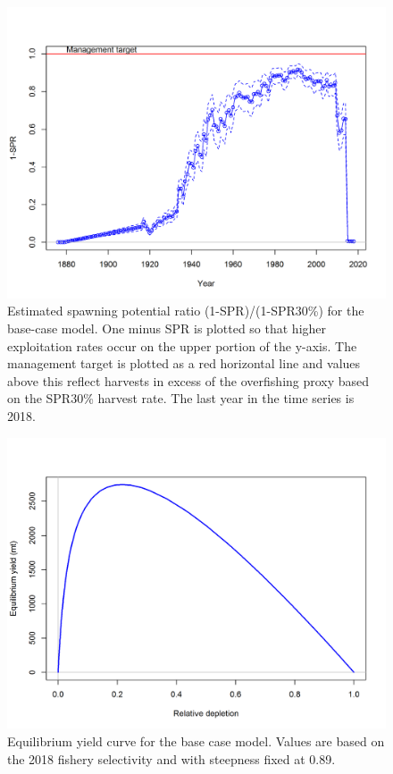 \documentclass[12pt,]{article}
\begin{document}
\begin{figure}[htbp]
\centering
\includegraphics{r4ss/plots_mod1/SPR3_ratiointerval.png}
\caption{Estimated spawning potential ratio (1-SPR)/(1-SPR30\%) for the
base-case model. One minus SPR is plotted so that higher exploitation
rates occur on the upper portion of the y-axis. The management target is
plotted as a red horizontal line and values above this reflect harvests
in excess of the overfishing proxy based on the SPR30\% harvest rate.
The last year in the time series is 2018. \label{fig:SPR}}
\end{figure}

\FloatBarrier

\begin{figure}[htbp]
\centering
\includegraphics{r4ss/plots_mod1/yield1_yield_curve.png}
\caption{Equilibrium yield curve for the base case model. Values are
based on the 2018 fishery selectivity and with steepness fixed at 0.89.
\label{fig:yield}}
\end{figure}
\end{document}
